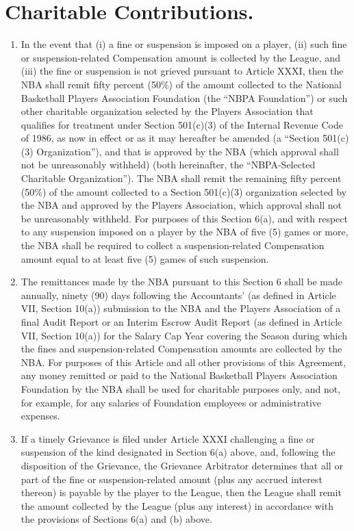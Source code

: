 \documentclass[
]{book}
\providecommand{\tightlist}{%
  \setlength{\itemsep}{0pt}\setlength{\parskip}{0pt}}
\begin{document}
\hypertarget{charitable-contributions.}{%
\section{Charitable Contributions.}\label{charitable-contributions.}}

\begin{enumerate}
\def\labelenumi{(\alph{enumi})}
\tightlist
\item
  In the event that (i) a fine or suspension is imposed on a player, (ii) such fine or suspension-related Compensation amount is collected by the League, and (iii) the fine or suspension is not grieved pursuant to Article XXXI, then the NBA shall remit fifty percent (50\%) of the amount collected to the National Basketball Players Association Foundation (the ``NBPA Foundation'') or such other charitable organization selected by the Players Association that qualifies for treatment under Section 501(c)(3) of the Internal Revenue Code of 1986, as now in effect or as it may hereafter be amended (a ``Section 501(c)(3) Organization''), and that is approved by the NBA (which approval shall not be unreasonably withheld) (both hereinafter, the ``NBPA-Selected Charitable Organization''). The NBA shall remit the remaining fifty percent (50\%) of the amount collected to a Section 501(c)(3) organization selected by the NBA and approved by the Players Association, which approval shall not be unreasonably withheld. For purposes of this Section 6(a), and with respect to any suspension imposed on a player by the NBA of five (5) games or more, the NBA shall be required to collect a suspension-related Compensation amount equal to at least five (5) games of such suspension.
\item
  The remittances made by the NBA pursuant to this Section 6 shall be made annually, ninety (90) days following the Accountants' (as defined in Article VII, Section 10(a)) submission to the NBA and the Players Association of a final Audit Report or an Interim Escrow Audit Report (as defined in Article VII, Section 10(a)) for the Salary Cap Year covering the Season during which the fines and suspension-related Compensation amounts are collected by the NBA. For purposes of this Article and all other provisions of this Agreement, any money remitted or paid to the National Basketball Players Association Foundation by the NBA shall be used for charitable purposes only, and not, for example, for any salaries of Foundation employees or administrative expenses.
\item
  If a timely Grievance is filed under Article XXXI challenging a fine or suspension of the kind designated in Section 6(a) above, and, following the disposition of the Grievance, the Grievance Arbitrator determines that all or part of the fine or suspension-related amount (plus any accrued interest thereon) is payable by the player to the League, then the League shall remit the amount collected by the League (plus any interest) in accordance with the provisions of Sections 6(a) and (b) above.
\end{enumerate}
\end{document}
